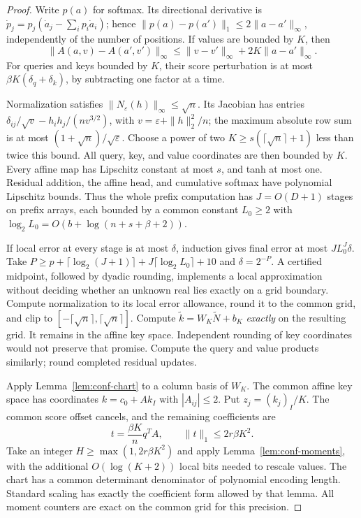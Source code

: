 \documentclass[11pt]{article}
\theoremstyle{definition}\newtheorem{definition}[theorem]{Definition}
\theoremstyle{remark}\newtheorem{remark}[theorem]{Remark}
\numberwithin{equation}{section}
\begin{document}
\begin{proof}
Write $p(a)$ for softmax. Its directional derivative is
$\dot p_j=p_j(\dot a_j-\sum_i p_i\dot a_i)$; hence
$\|p(a)-p(a')\|_1\le2\|a-a'\|_\infty$, independently of the
number of positions. If values are bounded by $K$, then
\begin{equation}
 \|A(a,v)-A(a',v')\|_\infty
 \le\|v-v'\|_\infty+2K\|a-a'\|_\infty.
 \label{eq:conf-attention-Lip}
\end{equation}
For queries and keys bounded by $K$, their score perturbation is at
most $\beta K(\delta_q+\delta_k)$, by subtracting one factor at a time.

Normalization satisfies $\|N_\varepsilon(h)\|_\infty\le\sqrt n$.
Its Jacobian has entries
$\delta_{ij}/\sqrt v-h_ih_j/(nv^{3/2})$, with
$v=\varepsilon+\|h\|_2^2/n$; the maximum absolute row sum is at most
$(1+\sqrt n)/\sqrt\varepsilon$. Choose a power of two
$K\ge s(\lceil\sqrt n\rceil+1)$ less than twice this bound.
All query, key, and value coordinates are then bounded by $K$.
Every affine map has Lipschitz constant at most $s$, and tanh at most
one. Residual addition, the affine head, and cumulative softmax have
polynomial Lipschitz bounds. Thus the whole prefix computation has
$J=O(D+1)$ stages on prefix arrays, each bounded by a common constant
$L_0\ge2$ with
$\log_2L_0=O(b+\log(n+s+\beta+2))$.

If local error at every stage is at most $\delta$, induction gives
final error at most $JL_0^J\delta$. Take
$P\ge p+\lceil\log_2(J+1)\rceil+J\lceil\log_2L_0\rceil+10$
and $\delta=2^{-P}$. A certified midpoint, followed by dyadic rounding,
implements a local approximation without deciding whether an unknown
real lies exactly on a grid boundary. Compute normalization to its
local error allowance, round it to the common grid, and clip to
$[-\lceil\sqrt n\rceil,\lceil\sqrt n\rceil]$. Compute
$\widetilde k=W_K\widetilde N+b_K$ \emph{exactly} on the resulting
grid. It remains in the affine key space. Independent rounding of key
coordinates would not preserve that promise. Compute the query and
value products similarly; round completed residual updates.

Apply Lemma~\ref{lem:conf-chart} to a column basis of $W_K$.
The common affine key space has coordinates $k=c_0+Ak_I$ with
$|A_{ij}|\le2$. Put $z_j=(k_j)_I/K$. The common score offset cancels,
and the remaining coefficients are
\[
 t=\frac{\beta K}{n}q^TA,\qquad \|t\|_1\le2r\beta K^2.
\]
Take an integer $H\ge\max(1,2r\beta K^2)$ and apply
Lemma~\ref{lem:conf-moments}, with the additional
$O(\log(K+2))$ local bits needed to rescale values. The chart has a
common determinant denominator of polynomial encoding length. Standard
scaling has exactly the coefficient form allowed by that lemma.
All moment counters are exact on the common grid for this precision.


\end{proof}
\end{document}
